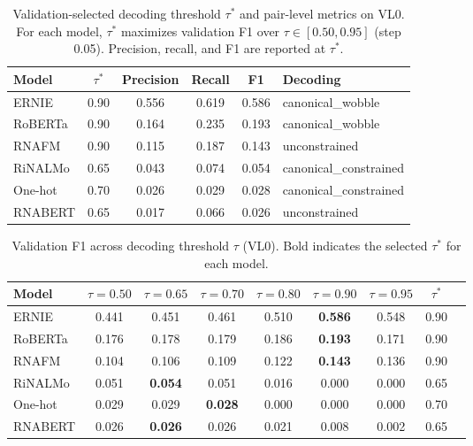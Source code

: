 
\begin{table}[htbp]
\centering
\caption{Validation-selected decoding threshold $\tau^*$ and pair-level metrics on VL0.
For each model, $\tau^*$ maximizes validation F1 over $\tau \in [0.50, 0.95]$ (step 0.05).
Precision, recall, and F1 are reported at $\tau^*$.}
\label{tab:best_config_val}
\begin{tabular}{lccccl}
\toprule
Model & $\tau^*$ & Precision & Recall & F1 & Decoding \\
\midrule
ERNIE & 0.90 & 0.556 & 0.619 & 0.586 & canonical\_wobble \\
RoBERTa & 0.90 & 0.164 & 0.235 & 0.193 & canonical\_wobble \\
RNAFM & 0.90 & 0.115 & 0.187 & 0.143 & unconstrained \\
RiNALMo & 0.65 & 0.043 & 0.074 & 0.054 & canonical\_constrained \\
One-hot & 0.70 & 0.026 & 0.029 & 0.028 & canonical\_constrained \\
RNABERT & 0.65 & 0.017 & 0.066 & 0.026 & unconstrained \\
\bottomrule
\end{tabular}
\end{table}

\begin{table}[htbp]
\centering
\caption{Validation F1 across decoding threshold $\tau$ (VL0).
Bold indicates the selected $\tau^*$ for each model.}
\label{tab:threshold_sweep_f1}
\begin{tabular}{lcccccccc}
\toprule
Model & $\tau{=}0.50$ & $\tau{=}0.65$ & $\tau{=}0.70$ & $\tau{=}0.80$ & $\tau{=}0.90$ & $\tau{=}0.95$ & $\tau^*$ \\
\midrule
ERNIE & 0.441 & 0.451 & 0.461 & 0.510 & \textbf{0.586} & 0.548 & 0.90 \\
RoBERTa & 0.176 & 0.178 & 0.179 & 0.186 & \textbf{0.193} & 0.171 & 0.90 \\
RNAFM & 0.104 & 0.106 & 0.109 & 0.122 & \textbf{0.143} & 0.136 & 0.90 \\
RiNALMo & 0.051 & \textbf{0.054} & 0.051 & 0.016 & 0.000 & 0.000 & 0.65 \\
One-hot & 0.029 & 0.029 & \textbf{0.028} & 0.000 & 0.000 & 0.000 & 0.70 \\
RNABERT & 0.026 & \textbf{0.026} & 0.026 & 0.021 & 0.008 & 0.002 & 0.65 \\
\bottomrule
\end{tabular}
\end{table}

